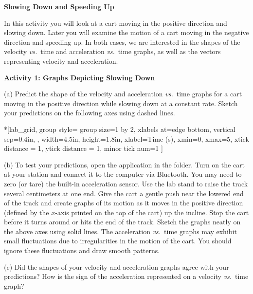 \medskip
\textbf{Slowing Down and Speeding Up }

In this activity you will look at a cart moving in the positive direction and slowing down. Later you will examine the motion of a cart moving in the negative direction and speeding up. In both cases, we are interested in the shapes of the velocity \textit{vs.}~time and acceleration \textit{vs.}~time graphs, as well as the vectors representing velocity and acceleration. 

\pagebreak[2]
\textbf{Activity 1: Graphs Depicting Slowing Down} 

(a) Predict the shape of the velocity and acceleration \textit{vs.}~time graphs
for a cart moving in the positive direction while slowing down at a constant rate. Sketch your predictions on the following axes using dashed lines.

\begin{lab_groupplot}*{}[lab_grid,
	group style={
		group size=1 by 2,
		xlabels at=edge bottom,
		vertical sep=0.4in,
		},
	width=4.5in,  height=1.8in,
	xlabel=Time (s),
	xmin=0, xmax=5,
	xtick distance = 1, 
	ytick distance = 1, 
	minor tick num=1
	]
\nextgroupplot[
	ymin=-1,ymax=1, 
	ylabel={Velocity (m/s)},
	]
\nextgroupplot[
	ymin=-1,ymax=1, 
	ylabel={Acceleration (m/s$^2$)},
	]
\end{lab_groupplot}

(b) To test your predictions, open the  application in the \filename{\coursefolder} folder. Turn on the cart at your station and connect it to the computer via Bluetooth. You may need to zero (or tare) the built-in acceleration sensor. Use the lab stand to raise the track several centimeters at one end. Give the cart a gentle push near the lowered end of the track and create graphs of its motion as it moves in the positive direction (defined by the $x$-axis printed on the top of the cart) up the incline. Stop the cart before it turns around or hits the end of the track. Sketch the graphs neatly on the above axes using solid lines. The acceleration \textit{vs.}~time graphs may exhibit small fluctuations due to irregularities in the motion of the cart. You should ignore these fluctuations and draw smooth patterns.

(c) Did the shapes of your velocity and acceleration graphs agree with your predictions? How is the sign of the acceleration represented on a velocity \textit{vs.}~time graph? 
\answerspace{15mm}

